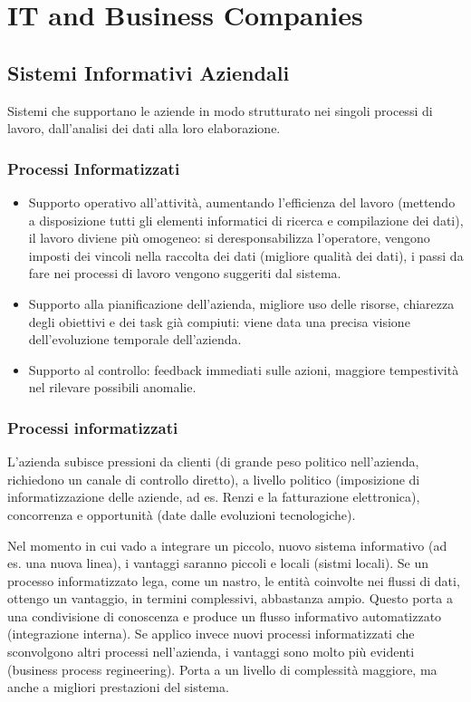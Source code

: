 \chapter{IT and Business Companies}
\label{chap:IT and Business Companies}
\section{Sistemi Informativi Aziendali}
\label{sec:Business Information System}
Sistemi che supportano le aziende in modo strutturato nei singoli processi di lavoro,
dall'analisi dei dati alla loro elaborazione.
\subsection{Processi Informatizzati}
\begin{itemize}
  \item Supporto operativo all'attivit\`a, aumentando l'efficienza del lavoro (mettendo a disposizione
  tutti gli elementi informatici di ricerca e compilazione dei dati), il lavoro diviene pi\`u omogeneo: si
  deresponsabilizza l'operatore, vengono imposti dei vincoli nella raccolta dei dati (migliore
  qualit\`a dei dati), i passi da fare nei processi di lavoro vengono suggeriti dal sistema.
  \item Supporto alla pianificazione dell'azienda, migliore uso delle risorse, chiarezza
  degli obiettivi e dei task gi\`a compiuti: viene data una precisa visione dell'evoluzione
  temporale dell'azienda.
  \item Supporto al controllo: feedback immediati sulle azioni, maggiore tempestivit\`a nel
  rilevare possibili anomalie.
\end{itemize}

\subsection{Processi informatizzati}
\label{sub:Processi informatizzati}
L'azienda subisce pressioni da clienti (di grande peso politico nell'azienda, richiedono un canale di controllo diretto),
a livello politico (imposizione
di informatizzazione delle aziende, ad es. Renzi e la fatturazione elettronica),
 concorrenza e opportunit\`a (date dalle evoluzioni tecnologiche).

Nel momento in cui vado a integrare un piccolo, nuovo sistema informativo (ad es. una nuova linea),
i vantaggi saranno piccoli e locali (sistmi locali).
Se un processo informatizzato lega, come un nastro, le entit\`a coinvolte nei flussi di dati, ottengo un vantaggio, in termini complessivi,
abbastanza ampio. Questo porta a una condivisione di conoscenza e produce un flusso informativo
automatizzato (integrazione interna).
Se applico invece nuovi processi informatizzati che sconvolgono altri processi nell'azienda, i vantaggi sono
molto pi\`u evidenti (business process regineering). Porta a un livello di
complessit\`a maggiore, ma anche a migliori prestazioni del sistema.
